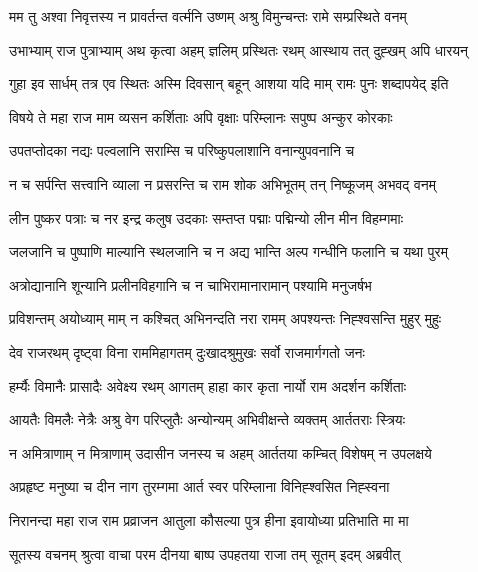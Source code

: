 
\twolineshloka
{मम तु अश्वा निवृत्तस्य न प्रावर्तन्त वर्त्मनि}
{उष्णम् अश्रु विमुन्चन्तः रामे सम्प्रस्थिते वनम्} %

\twolineshloka
{उभाभ्याम् राज पुत्राभ्याम् अथ कृत्वा अहम् ज्ञलिम्}
{प्रस्थितः रथम् आस्थाय तत् दुह्खम् अपि धारयन्} %

\twolineshloka
{गुहा इव सार्धम् तत्र एव स्थितः अस्मि दिवसान् बहून्}
{आशया यदि माम् रामः पुनः शब्दापयेद् इति} %

\twolineshloka
{विषये ते महा राज माम व्यसन कर्शिताः}
{अपि वृक्षाः परिम्लानः सपुष्प अन्कुर कोरकाः} %

\twolineshloka
{उपतप्तोदका नद्यः पल्वलानि सराम्सि च}
{परिष्कुपलाशानि वनान्युपवनानि च} %

\twolineshloka
{न च सर्पन्ति सत्त्वानि व्याला न प्रसरन्ति च}
{राम शोक अभिभूतम् तन् निष्कूजम् अभवद् वनम्} %

\twolineshloka
{लीन पुष्कर पत्राः च नर इन्द्र कलुष उदकाः}
{सम्तप्त पद्माः पद्मिन्यो लीन मीन विहम्गमाः} %

\twolineshloka
{जलजानि च पुष्पाणि माल्यानि स्थलजानि च}
{न अद्य भान्ति अल्प गन्धीनि फलानि च यथा पुरम्} %

\twolineshloka
{अत्रोद्यानानि शून्यानि प्रलीनविहगानि च}
{न चाभिरामानारामान् पश्यामि मनुजर्षभ} %

\twolineshloka
{प्रविशन्तम् अयोध्याम् माम् न कश्चित् अभिनन्दति}
{नरा रामम् अपश्यन्तः निह्श्वसन्ति मुहुर् मुहुः} %

\twolineshloka
{देव राजरथम् दृष्ट्वा विना राममिहागतम्}
{दुःखादश्रुमुखः सर्वो राजमार्गगतो जनः} %

\twolineshloka
{हर्म्यैः विमानैः प्रासादैः अवेक्ष्य रथम् आगतम्}
{हाहा कार कृता नार्यो राम अदर्शन कर्शिताः} %

\twolineshloka
{आयतैः विमलैः नेत्रैः अश्रु वेग परिप्लुतैः}
{अन्योन्यम् अभिवीक्षन्ते व्यक्तम् आर्ततराः स्त्रियः} %

\twolineshloka
{न अमित्राणाम् न मित्राणाम् उदासीन जनस्य च}
{अहम् आर्ततया कम्चित् विशेषम् न उपलक्षये} %

\twolineshloka
{अप्रहृष्ट मनुष्या च दीन नाग तुरम्गमा}
{आर्त स्वर परिम्लाना विनिह्श्वसित निह्स्वना} %

\twolineshloka
{निरानन्दा महा राज राम प्रव्राजन आतुला}
{कौसल्या पुत्र हीना इवायोध्या प्रतिभाति मा मा} %

\twolineshloka
{सूतस्य वचनम् श्रुत्वा वाचा परम दीनया}
{बाष्प उपहतया राजा तम् सूतम् इदम् अब्रवीत्} %

